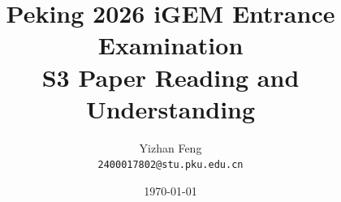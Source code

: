 \title{\textbf{Peking 2026 iGEM Entrance Examination} \\[0.5em]
    \Large S3 Paper Reading and Understanding}
\author{Yizhan Feng \\ 
    \normalsize{\texttt{2400017802@stu.pku.edu.cn}}}
\date{\today}